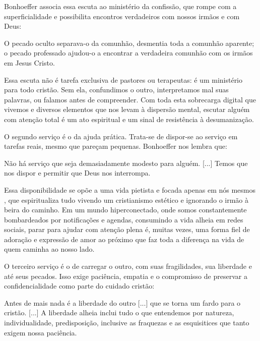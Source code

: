 Bonhoeffer associa essa escuta ao ministério da confissão, que rompe com a superficialidade e possibilita encontros verdadeiros com nossos irmãos e com Deus:

\begin{citacao}
    O pecado oculto separava-o da comunhão, desmentia toda a comunhão aparente; o pecado professado ajudou-o a encontrar a verdadeira comunhão com os irmãos em Jesus Cristo. \cite[p.~88]{bonhoeffer1997}
\end{citacao}

Essa escuta não é tarefa exclusiva de pastores ou terapeutas: é um ministério para todo cristão. Sem ela, confundimos o outro, interpretamos mal suas palavras, ou falamos antes de compreender. Com toda esta sobrecarga digital que vivemos e diversos elementos que nos levam à dispersão mental, escutar alguém com atenção total é um ato espiritual e um sinal de resistência à desumanização.

O segundo serviço é o da ajuda prática. Trata-se de dispor-se ao serviço em tarefas reais, mesmo que pareçam pequenas. Bonhoeffer nos lembra que:

\begin{citacao}
    Não há serviço que seja demasiadamente modesto para alguém. [...] Temos que nos dispor e permitir que Deus nos interrompa. \cite[p.~77]{bonhoeffer1997}
\end{citacao}

Essa disponibilidade se opõe a uma vida pietista e focada apenas em nós mesmos , que espiritualiza tudo vivendo um cristianismo estético e ignorando o irmão à beira do caminho. Em um mundo hiperconectado, onde somos constantemente bombardeados por notificações e agendas, consumindo a vida alheia em redes sociais, parar para ajudar com atenção plena é, muitas vezes, uma forma fiel de adoração e expressão de amor ao próximo que faz toda a diferença na vida de quem caminha ao nosso lado.

O terceiro serviço é o de carregar o outro, com suas fragilidades, sua liberdade e até seus pecados. Isso exige paciência, empatia e o compromisso de preservar a confidencialidade como parte do cuidado cristão:

\begin{citacao}
    Antes de mais nada é a liberdade do outro [...] que se torna um fardo para o cristão. [...] A liberdade alheia inclui tudo o que entendemos por natureza, individualidade, predisposição, inclusive as fraquezas e as esquisitices que tanto exigem nossa paciência. \cite[p.~78]{bonhoeffer1997}
\end{citacao}

